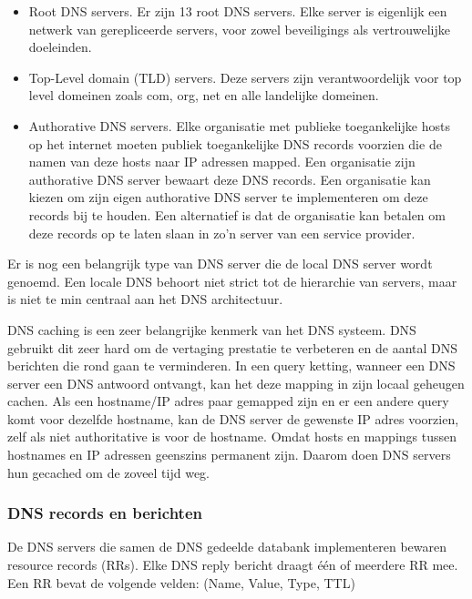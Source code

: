 \begin{itemize}
    \item Root DNS servers. Er zijn 13 root DNS servers. Elke server is eigenlijk een netwerk van gerepliceerde servers, voor zowel beveiligings als vertrouwelijke doeleinden.
\item Top-Level domain (TLD) servers. Deze servers zijn verantwoordelijk voor top level domeinen zoals com, org, net en alle landelijke domeinen.
\item Authorative DNS servers. Elke organisatie met publieke toegankelijke hosts op het internet moeten publiek toegankelijke DNS records voorzien die de namen van deze hosts naar IP adressen mapped. Een organisatie zijn authorative DNS server bewaart deze DNS records. Een organisatie kan kiezen om zijn eigen authorative DNS server te implementeren om deze records bij te houden. Een alternatief is dat de organisatie kan betalen om deze records op te laten slaan in zo’n server van een service provider.
\end{itemize}

Er is nog een belangrijk type van DNS server die de local DNS server wordt genoemd. Een locale DNS behoort niet strict tot de hierarchie van servers, maar is niet te min centraal aan het DNS architectuur. 


DNS caching is een zeer belangrijke kenmerk van het DNS systeem. DNS gebruikt dit zeer hard om de vertaging prestatie te verbeteren en de aantal DNS berichten die rond gaan te verminderen. In een query ketting, wanneer een DNS server een DNS antwoord ontvangt, kan het deze mapping in zijn locaal geheugen cachen. Als een hostname/IP adres paar gemapped zijn en er een andere query komt voor dezelfde hostname, kan de DNS server de gewenste IP adres voorzien, zelf als niet authoritative is voor de hostname. Omdat hosts en mappings tussen hostnames en IP adressen geenszins permanent zijn. Daarom doen DNS servers hun gecached om de zoveel tijd weg.

\clearpage

\subsubsection{DNS records en berichten}

De DNS servers die samen de DNS gedeelde databank implementeren bewaren resource records (RRs). Elke DNS reply bericht draagt één of meerdere RR mee. Een RR bevat de volgende velden:
(Name, Value, Type, TTL)

